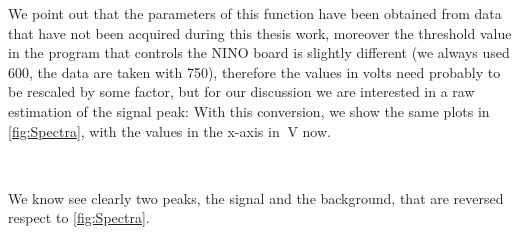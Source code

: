 We point out that the parameters of this function have been obtained from data that have not been acquired during this thesis work, moreover the threshold value in the program that controls the NINO board is slightly different (we always used 600, the data are taken with 750), therefore the values in volts need probably to be rescaled by some factor, but for our discussion we are interested in a raw estimation of the signal peak:
With this conversion, we show the same plots in \ref{fig:Spectra}, with the values in the x-axis in $\SI{}{\volt}$ now.

\begin{figure}[h]
\centering
{}
\\
\end{figure}

We know see clearly two peaks, the signal and the background, that are reversed respect to \ref{fig:Spectra}.

